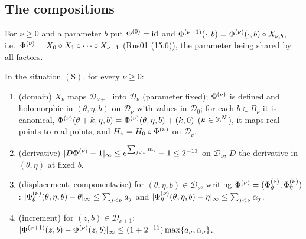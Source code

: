 \subsection{The compositions}\label{bpP:p11a:sec-comp}

For $\nu\ge0$ and a parameter $b$ put $\Phi^{(0)}=\mathrm{id}$ and $\Phi^{(\nu+1)}(\cdot,b)=\Phi^{(\nu)}(\cdot,b)\circ X_{\nu,b}$, i.e.\ $\Phi^{(\nu)}=X_0\circ X_1\circ\dots\circ X_{\nu-1}$ (Rus01 (15.6)), the parameter being shared by all factors.

\begin{lemma}\label{bpP:p11a:composition}
In the situation $(\mathrm S)$, for every $\nu\ge0$:
\begin{enumerate}[label=(\alph*)]
\item (domain) $X_\nu$ maps $\mathcal D_{\nu+1}$ into $\mathcal D_\nu$ (parameter fixed); $\Phi^{(\nu)}$ is defined and holomorphic in $(\theta,\eta,b)$ on $\mathcal D_\nu$ with values in $\mathcal D_0$; for each $b\in B_\nu$ it is canonical, $\Phi^{(\nu)}(\theta+k,\eta,b)=\Phi^{(\nu)}(\theta,\eta,b)+(k,0)$ ($k\in\mathbb{Z}^N$), it maps real points to real points, and $H_\nu=H_0\circ\Phi^{(\nu)}$ on $\mathcal D_\nu$.
\item (derivative) $\lvert D\Phi^{(\nu)}-\mathbf 1\rvert_\infty\le e^{\sum_{j<\nu}m_j}-1\le2^{-11}$ on $\mathcal D_\nu$, $D$ the derivative in $(\theta,\eta)$ at fixed $b$.
\item (displacement, componentwise) for $(\theta,\eta,b)\in\mathcal D_\nu$, writing $\Phi^{(\nu)}=(\Phi^{(\nu)}_\theta,\Phi^{(\nu)}_\eta)$: $\lvert\Phi^{(\nu)}_\theta(\theta,\eta,b)-\theta\rvert_\infty\le\sum_{j<\nu}a_j$ and $\lvert\Phi^{(\nu)}_\eta(\theta,\eta,b)-\eta\rvert_\infty\le\sum_{j<\nu}\alpha_j$.
\item (increment) for $(z,b)\in\mathcal D_{\nu+1}$: $\lvert\Phi^{(\nu+1)}(z,b)-\Phi^{(\nu)}(z,b)\rvert_\infty\le(1+2^{-11})\max\{a_\nu,\alpha_\nu\}$.
\end{enumerate}
\end{lemma}
